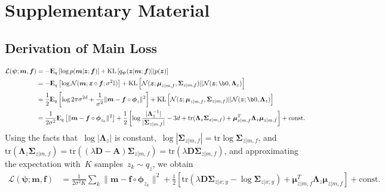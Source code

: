 \documentclass{article}
\newcommand{\bD}{\boldsymbol{D}}
\newcommand{\bA}{\boldsymbol{A}}
\newcommand{\bmu}{\boldsymbol{\mu}}
\newcommand{\bphi}{\boldsymbol{\phi}}
\newcommand{\bpsi}{\boldsymbol{\psi}}
\newcommand{\bSigma}{\boldsymbol{\Sigma}}
\newcommand{\bLambda}{\boldsymbol{\Lambda}}
\newcommand{\KL}{\text{KL}}
\newcommand{\bz}{\boldsymbol{z}}
\newcommand{\bmoving}{\boldsymbol{m}}
\newcommand{\bfixed}{\boldsymbol{f}}
\newcommand{\moving}{m}
\newcommand{\fixed}{f}
\newcommand{\Expect}{{\rm I\kern-.3em E}}
\begin{document}





\clearpage
\onecolumn
\section*{Supplementary Material}

\subsection*{Derivation of Main Loss}
\label{sec:sup:loss-derivation}

\begin{align}
\mathcal{L}(\bpsi; \bmoving, \bfixed)  &= - \Expect_{q} \left[ \log p(\bmoving | \bz ; \bfixed) \right] + \KL \left[  q_{\bpsi}(\bz|\bmoving; \bfixed) ||  p(\bz)  \right]  \nonumber \\
&= - \Expect_{q} \left[ \log \mathcal{N}(\bmoving ; \bz \circ \bfixed; \sigma^2 \mathbb{I}) \right] 
+ \KL \left[  \mathcal{N}(\bz; \bmu_{z | \moving, \fixed}, \bSigma_{z | \moving, \fixed}) ||  \mathcal{N}(\bz; \b0, \bLambda_z)  \right]  \nonumber \\
&= \frac{1}{2} \Expect_{q} \left[ \log 2\pi \sigma^{2d} + \frac{1}{\sigma^2}\|\bmoving - \bfixed \circ \bphi_{z}\|^2
\right] 
+ \KL \left[  \mathcal{N}(\bz; \bmu_{z | \moving, \fixed}, \bSigma_{z | \moving, \fixed}) ||  \mathcal{N}(\bz; \b0, \bLambda_z)  \right]  \nonumber \\
&= \frac{1}{2\sigma^2}  \Expect_{q} \left[ \|\bmoving - \bfixed \circ \bphi_{z_k}\|^2 \right]
+ \frac{1}{2} \left[ \log\frac{|\bLambda_z^{-1}|}{|\bSigma_{z | \moving, \fixed}|} - 3d + \text{tr}(\bLambda_z \bSigma_{z | \moving, \fixed})  + \bmu_{z | \moving, \fixed}^T \bLambda_z \bmu_{z | \moving, \fixed} \right] + \text{const}. \nonumber
\end{align}
Using the facts that~$\log |\bLambda_z|$ is constant,~$\log|\bSigma_{z | \moving, \fixed}| = \text{tr}\log\bSigma_{z | \moving, \fixed}$, and~$ \text{tr}(\bLambda_z \bSigma_{z | \moving, \fixed}) = \text{tr}((\lambda \bD - \bA) \bSigma_{z | \moving, \fixed}) = \text{tr}(\lambda \bD \bSigma_{z | \moving, \fixed})$, and approximating the expectation with~$K$ samples~$z_k \sim q_z$, we obtain
\begin{align}
\mathcal{L}(\bpsi; \bmoving, \bfixed) &= \frac{1}{2\sigma^2K} \sum_k \|\bmoving - \bfixed \circ \bphi_{z_k}\|^2 + \frac{1}{2} \left[ \text{tr}(\lambda\bD \bSigma_{z|x;y} - \log\bSigma_{z|x;y}) + \bmu_{z | \moving, \fixed}^T \bLambda_z \bmu_{z | \moving, \fixed} \right] + \text{const}.
\label{eq:sup:main_loss}
\end{align}
\end{document}
